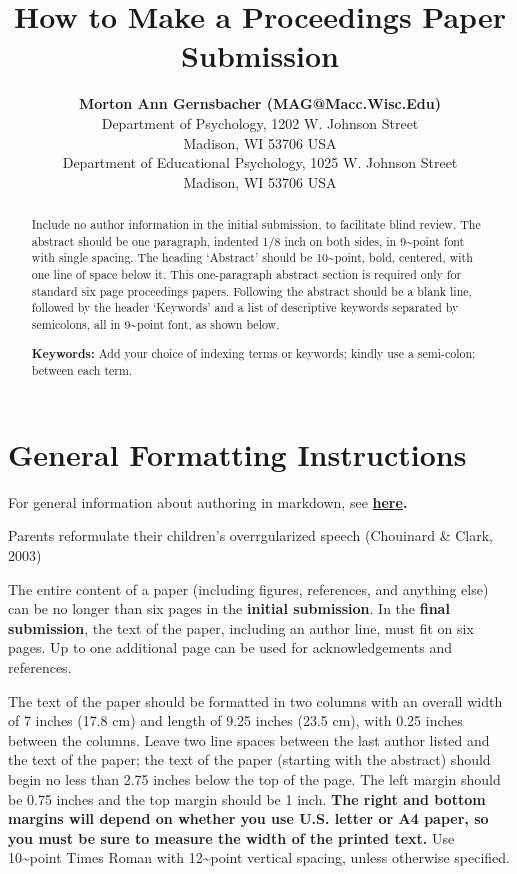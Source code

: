 \documentclass[10pt, letterpaper]{article}
\title{How to Make a Proceedings Paper Submission}
\author{{\large \bf Morton Ann Gernsbacher (MAG@Macc.Wisc.Edu)} \\ Department of Psychology, 1202 W. Johnson Street \\ Madison, WI 53706 USA \AND {\large \bf Sharon J.~Derry (SDJ@Macc.Wisc.Edu)} \\ Department of Educational Psychology, 1025 W. Johnson Street \\ Madison, WI 53706 USA}
\begin{document}
\maketitle

\begin{abstract}
Include no author information in the initial submission, to facilitate
blind review. The abstract should be one paragraph, indented 1/8 inch on
both sides, in 9\textasciitilde point font with single spacing. The
heading `Abstract' should be 10\textasciitilde point, bold, centered,
with one line of space below it. This one-paragraph abstract section is
required only for standard six page proceedings papers. Following the
abstract should be a blank line, followed by the header `Keywords' and a
list of descriptive keywords separated by semicolons, all in
9\textasciitilde point font, as shown below.

\textbf{Keywords:}
Add your choice of indexing terms or keywords; kindly use a semi-colon;
between each term.
\end{abstract}

\hypertarget{general-formatting-instructions}{%
\section{General Formatting
Instructions}\label{general-formatting-instructions}}

For general information about authoring in markdown, see
\textbf{\href{http://rmarkdown.rstudio.com/authoring_basics.html}{here}.}

Parents reformulate their children's overrgularized speech (Chouinard \&
Clark, 2003)

The entire content of a paper (including figures, references, and
anything else) can be no longer than six pages in the
\textbf{initial submission}. In the \textbf{final submission}, the text
of the paper, including an author line, must fit on six pages. Up to one
additional page can be used for acknowledgements and references.

The text of the paper should be formatted in two columns with an overall
width of 7 inches (17.8 cm) and length of 9.25 inches (23.5 cm), with
0.25 inches between the columns. Leave two line spaces between the last
author listed and the text of the paper; the text of the paper (starting
with the abstract) should begin no less than 2.75 inches below the top
of the page. The left margin should be 0.75 inches and the top margin
should be 1 inch. \textbf{The right and bottom margins will depend on
whether you use U.S. letter or A4 paper, so you must be sure to
measure the width of the printed text.} Use 10\textasciitilde point
Times Roman with 12\textasciitilde point vertical spacing, unless
otherwise specified.
\end{document}
